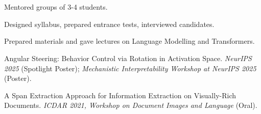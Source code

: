 



\\

\\
\begin{zitemize}
    \item Mentored groups of 3-4 students.
    \item Designed syllabus, prepared entrance tests, interviewed candidates.
    \item Prepared materials and gave lectures on Language Modelling and Transformers.
\end{zitemize}

\begin{zitemize}
    \item Angular Steering: Behavior Control via Rotation in Activation Space. \textit{NeurIPS 2025}
    (Spotlight Poster); \textit{Mechanistic Interpretability Workshop at NeurIPS 2025} (Poster).
    \item A Span Extraction Approach for Information Extraction on Visually-Rich Documents.
    \textit{ICDAR 2021, Workshop on Document Images and Language} (Oral).
\end{zitemize}